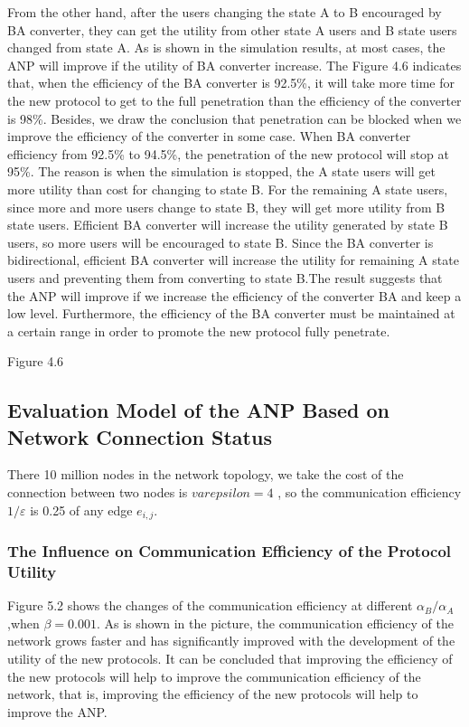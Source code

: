 \documentclass{article}
\begin{document}
From the other hand, after the users changing the state A to B encouraged by BA converter, they can get the utility
from other state A users and  B state users changed from state A. As is shown in the simulation results, at most cases,
the ANP will improve if the utility of BA converter increase. The Figure 4.6 indicates that, when the efficiency of
the BA converter is 92.5\%, it will take more time for the new protocol to get to the full penetration than the
efficiency of the converter is 98\%. Besides, we draw the conclusion that penetration can be blocked when we improve
the efficiency of the converter in some case. When BA converter efficiency from 92.5\% to 94.5\%,  the penetration
of the new protocol will stop at 95\%. The reason is when the simulation is stopped, the A state users will get more
utility than cost for changing to state B. For the remaining A state users, since more and more users change to state B,
they will get more utility from B state users. Efficient BA converter will increase the utility generated by state B
users, so more users will be encouraged to state B. Since the BA converter is bidirectional, efficient BA converter
will increase the utility for remaining A state users and preventing them from converting to state B.The result suggests
that the ANP will improve if we increase the efficiency of the converter BA and keep a low level. Furthermore, the
efficiency of the BA converter must be maintained at a certain range in order to promote the new protocol fully penetrate.

Figure 4.6
\subsection{Evaluation Model of the ANP Based on Network Connection Status}
There 10 million nodes in the network topology, we take the cost of the connection between two nodes is $varepsilon=4$ ,
so the communication efficiency $1/\varepsilon$ is 0.25 of any edge $e_{i,j}$.
\subsubsection{The Influence on Communication Efficiency  of the Protocol Utility}
Figure 5.2 shows the changes of the communication efficiency at different $\alpha_B/\alpha_A$,when $\beta=0.001$. As is
shown in the picture, the communication efficiency of the network grows faster and has significantly improved with the
development of the utility of the new protocols. It can be concluded that improving the efficiency of the new protocols
will help to improve the communication efficiency of the network, that is, improving the efficiency of the new protocols
will help to improve the ANP.
\end{document}
